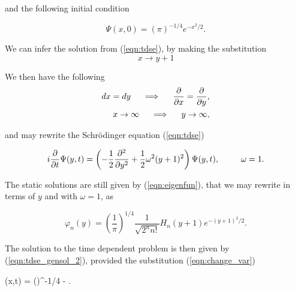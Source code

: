 \noindent and the following initial condition

\begin{equation}
	\Psi(x,0) = \left(\pi\right)^{-1/4} e^{-x^2/2} \label{eqn:init2}.
\end{equation}

\noindent We can infer the solution from (\ref{eqn:tdse}), 
by making the substitution
\begin{equation}
   x \rightarrow y+1   \label{eqn:change_var}
\end{equation}

\noindent We then have the following
\begin{align}
    dx = dy \hspace{5mm} \Longrightarrow \hspace{5mm} 
	   \frac{\partial}{\partial x}  = \frac{\partial}{\partial y}, \\
	x \rightarrow \infty \hspace{5mm} \Longrightarrow \hspace{5mm} 
	 y \rightarrow \infty,
\end{align}

\noindent and may rewrite the Schr\"odinger equation (\ref{eqn:tdse})

\begin{equation}
 i\frac{\partial}{\partial t}\Psi(y,t) = 
	\left(-\frac{1}{2}\frac{\partial^2}{\partial y^2} + \frac{1}{2}\omega^2(y+1)^2\right)\Psi(y,t),
	  \hspace{9mm} \omega=1 \label{eq:tdse2}.
\end{equation}

\noindent The static solutions are still given by (\ref{eqn:eigenfun}), 
that we may rewrite in terms of $y$ and with $\omega=1$, as

\begin{equation}
 \varphi_n(y) = 
	\left(\frac{1}{\pi}\right)^{1/4}
	 \frac{1}{\sqrt{2^n n!}}H_n(y+1)e^{-(y+1)^2/2}.
	 \label{eq:static2}
\end{equation}

\noindent The solution to the time dependent problem is then given by 
(\ref{eqn:tdse_gensol_2}), provided the substitution (\ref{eqn:change_var})

\begin{\eq}
	\psi(x,t) = \left(\pi\right)^{-1/4}
         \exp\left\lbrace -
\right\rbrace.
                  \label{eqn:tdse_gensol_3}
\end{\eq}

